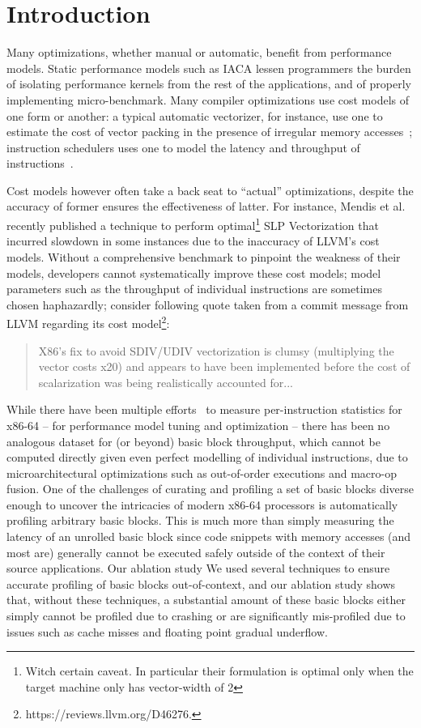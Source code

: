 \section{Introduction}
Many optimizations, whether manual or automatic,
benefit from performance models.
Static performance models such as IACA lessen programmers
the burden of isolating performance kernels from
the rest of the applications,
and of properly implementing micro-benchmark. Many compiler optimizations
use cost models of one form or another:
a typical automatic vectorizer, for instance,
use one to estimate the cost of vector packing
in the presence of irregular memory accesses~\cite{goslp};
instruction schedulers uses one to model the latency
and throughput of instructions~\cite{llvm-sched,gcc-sched}.

Cost models however often take a back seat to “actual” optimizations,
despite the accuracy of former ensures the effectiveness of latter.
For instance, Mendis et al.\cite{goslp}
recently published a technique to perform optimal\footnote{
Witch certain caveat.
In particular their formulation is optimal
only when the target machine only has vector-width of 2}
SLP Vectorization\cite{slp} that
incurred slowdown in some instances due to the inaccuracy of 
LLVM's cost models.
Without a comprehensive benchmark to pinpoint the weakness of their models,
developers cannot systematically improve these cost models;
model parameters
such as the throughput of individual instructions
are sometimes chosen haphazardly;
consider following quote taken from a commit message from LLVM\cite{llvm}
regarding its cost model\footnote{
https://reviews.llvm.org/D46276.
}:
\begin{quote}
X86's fix to avoid SDIV/UDIV vectorization is clumsy
(multiplying the vector costs x20)
and appears to have been implemented before the cost of
scalarization was being realistically accounted for...
\end{quote}

While there have been multiple efforts~\cite{agner,uops,exegesis} to measure per-instruction
statistics for x86-64 -- for performance model tuning and optimization --
there has been no analogous dataset for (or beyond) basic block throughput,
which cannot be computed directly given even perfect modelling of individual instructions,
due to microarchitectural optimizations such as out-of-order executions and macro-op fusion.
One of the challenges of curating and profiling a set of basic blocks diverse enough to
uncover the intricacies of modern x86-64 processors is automatically profiling arbitrary
basic blocks.
This is much more than simply measuring the latency of an unrolled basic block
since code snippets with memory accesses (and most are)
generally cannot be executed safely
outside of the context of their source applications.
Our ablation study %
We used several techniques to ensure accurate profiling of basic blocks out-of-context,
and our ablation study shows that, without these techniques,
a substantial amount of these basic blocks either simply cannot be profiled due to crashing
or are significantly mis-profiled due to issues such as cache misses and floating point gradual underflow.

